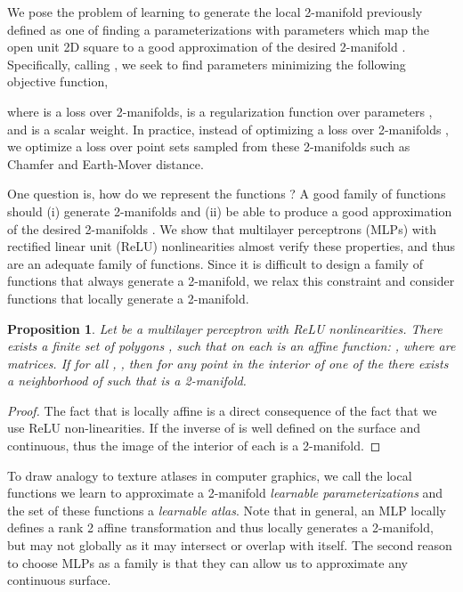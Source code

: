 \documentclass[10pt,twocolumn,letterpaper]{article}
\begin{document}
We pose the problem of learning to generate the local 2-manifold previously defined as one of finding a parameterizations  with parameters  which map the open unit 2D square  to a good approximation of the desired 2-manifold . 
Specifically, calling ,
we seek to find parameters  minimizing the following objective function,

where  is a loss over 2-manifolds,  is a regularization function over parameters , and  is a scalar weight. 
In practice, instead of optimizing a loss over 2-manifolds , we optimize a loss over point sets sampled from these 2-manifolds such as Chamfer and Earth-Mover distance. 




One question is, how do we represent the functions ? A good family of functions should (i) generate 2-manifolds and (ii) be able to produce a good approximation of the desired 2-manifolds . 
We show that multilayer perceptrons (MLPs) with rectified linear unit (ReLU) nonlinearities almost verify these properties, and thus are an adequate family of functions.
Since it is difficult to design a family of functions that always generate a 2-manifold, we relax this constraint and consider functions that locally generate a 2-manifold. 


\newtheorem{proposition}{Proposition}


\begin{proposition}
Let  be a multilayer perceptron with ReLU nonlinearities. There exists a finite set of polygons ,  such that on each   is an affine function: , where  are  matrices. If for all , , then for any point   in the interior of one of the  there exists a neighborhood  of  such that  is a 2-manifold. 
\end{proposition}

\begin{proof}
The fact that  is locally affine is a direct consequence of the fact that we use ReLU non-linearities. If  the inverse of  is well defined on the surface and continuous, thus the image of the interior of each  is a 2-manifold.  
\end{proof}


To draw analogy to texture atlases in computer graphics, we call the local functions we learn to approximate a 2-manifold {\it learnable parameterizations} and the set of these functions  a {\it learnable atlas}. 
Note that in general, an MLP locally defines a rank 2 affine transformation and thus locally generates a 2-manifold, but may not globally as it may 
intersect or overlap with itself. The second reason to choose MLPs as a family is that they can allow us to approximate any continuous surface.
\end{document}
